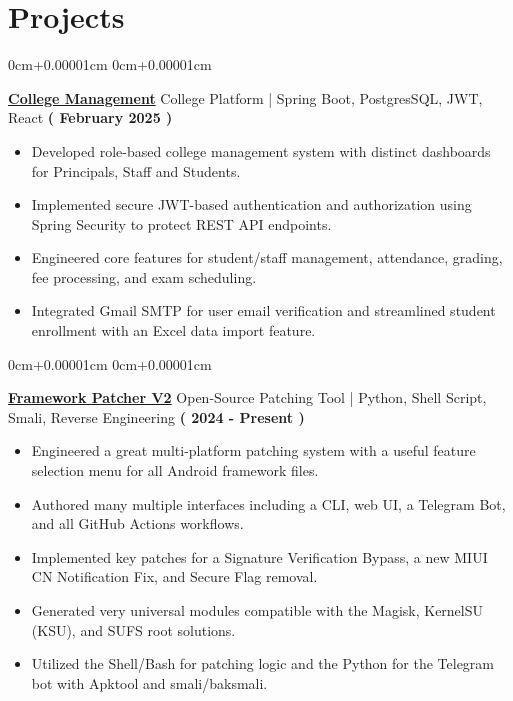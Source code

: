 \documentclass[10pt,a4paper]{article}
\newenvironment{highlights}{
    \begin{itemize}[
        topsep=0.10cm,
        parsep=0.10cm,
        partopsep=0pt,
        itemsep=0pt,
        leftmargin=10pt,
    ]
    }{
    \end{itemize}
}
\newenvironment{onecolentry}{
    \begin{adjustwidth}{
        0cm+0.00001cm
    }{
        0cm+0.00001cm
    }
    }{
    \end{adjustwidth}
}
\begin{document}
    \section{Projects}\label{sec:projects}
    \begin{onecolentry}
        \textbf{\href{https://github.com/jefino9488/college-management-server}{College Management}} College Platform | Spring Boot, PostgresSQL, JWT, React \hfill \textbf{( February 2025 )} \\
        \begin{highlights}
            \item Developed role-based college management system with distinct dashboards for Principals, Staff and Students. \\
            \item Implemented secure JWT-based authentication and authorization using Spring Security to protect REST API endpoints. \\
            \item Engineered core features for student/staff management, attendance, grading, fee processing, and exam scheduling. \\
            \item Integrated Gmail SMTP for user email verification and streamlined student enrollment with an Excel data import feature. \\
        \end{highlights}
    \end{onecolentry}
    \vspace{0.1cm}
    \begin{onecolentry}
        \textbf{\href{https://github.com/Jefino9488/FrameworkPatcherV2}{Framework Patcher V2}} Open-Source Patching Tool | Python, Shell Script, Smali, Reverse Engineering \hfill \textbf{( 2024 - Present )} \\
        \begin{highlights}
            \item Engineered a great multi-platform patching system with a useful feature selection menu for all Android framework files.
            \item Authored many multiple interfaces including a CLI, web UI, a Telegram Bot, and all GitHub Actions workflows.
            \item Implemented key patches for a Signature Verification Bypass, a new MIUI CN Notification Fix, and Secure Flag removal.
            \item Generated very universal modules compatible with the Magisk, KernelSU (KSU), and SUFS root solutions.
            \item Utilized the Shell/Bash for patching logic and the Python for the Telegram bot with Apktool and smali/baksmali.
        \end{highlights}
    \end{onecolentry}
\end{document}
